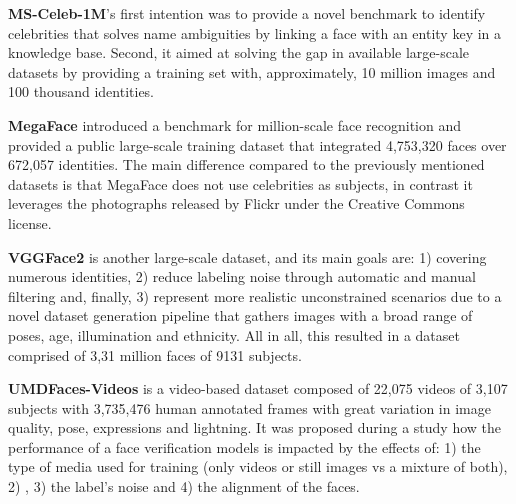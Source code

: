 \documentclass[class=report, crop=false, a4paper, 12pt]{standalone}
\begin{document}


\vspace{0.7\baselineskip}
\noindent\textbf{MS-Celeb-1M}'s \autocite{guoMSCeleb1MDatasetBenchmark2016} first intention was to provide a novel benchmark to identify celebrities that solves name ambiguities by linking a face with an entity key in a knowledge base. Second, it aimed at solving the gap in available large-scale datasets by providing a training set with, approximately, 10 million images and 100 thousand identities.

\vspace{0.7\baselineskip}
\noindent\textbf{MegaFace} \autocite{nechLevelPlayingField2017} introduced a benchmark for million-scale face recognition and provided a public large-scale training dataset that integrated 4,753,320 faces over 672,057 identities. The main difference compared to the previously mentioned datasets is that MegaFace does not use celebrities as subjects, in contrast it leverages the photographs released by Flickr under the Creative Commons license. 

\vspace{0.7\baselineskip}
\noindent\textbf{VGGFace2} \autocite{caoVGGFace2DatasetRecognising2018} is another large-scale dataset, and its main goals are: 1) covering numerous identities, 2) reduce labeling noise through automatic and manual filtering and, finally, 3) represent more realistic unconstrained scenarios due to a novel dataset generation pipeline that gathers images with a broad range of poses, age, illumination and ethnicity. All in all, this resulted in a dataset comprised of 3,31 million faces of 9131 subjects.

\vspace{0.7\baselineskip}
\noindent\textbf{UMDFaces-Videos} \autocite{bansalDonTsCNNbased2017} is a video-based dataset composed of 22,075 videos of 3,107 subjects with 3,735,476 human annotated frames with great variation in image quality, pose, expressions and lightning. It was proposed during a study how the performance of a face verification models is impacted by the effects of: 1) the type of media used for training (only videos or still images vs a mixture of both), 2) , 3) the label's noise and 4) the alignment of the faces.
\end{document}
